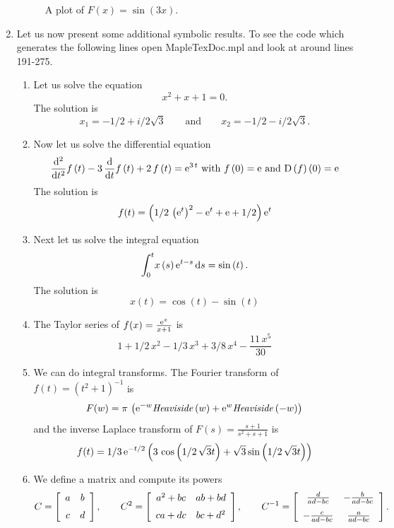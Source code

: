 \documentclass{article}
\begin{document}
\begin{enumerate}
\begin{figure}[H]
 \caption{A plot of \(F(x)=\sin(3x)\).}  \label{FIG001}
 \end{figure}
 \item Let us now present  some additional symbolic results. To see the code which
 generates the following lines open \textsf{MapleTexDoc.mpl} and look at around lines 191-275.
 \begin{enumerate}
 \item Let us solve the equation
 \[
 {x}^{2}+x+1=0. 
 \]
 The solution is
 \[
 x_1=-1/2+i/2\sqrt {3} \qquad \text{and} \qquad x_2=-1/2-i/2\sqrt {3}.  
 \]
 \item Now let us solve the differential equation
 \[
 {\frac {{\rm d}^{2}}{{\rm d}{t}^{2}}}f \left( t \right) -3\,{\frac {\rm d}{{\rm d}t}}f \left( t \right) +2\,f \left( t \right) ={{\rm e}^{3\,t}} \text{ with } f \left( 0 \right) ={\rm e} \text{ and } \mbox {D} \left( f \right)  \left( 0 \right) ={\rm e} 
 \]
 The solution is
 \[
 f(t)= \left( 1/2\, \left( {{\rm e}^{t}} \right) ^{2}-{{\rm e}^{t}}+{\rm e}+1/2 \right) {{\rm e}^{t}} 
 \]
 \item Next let us solve the integral equation
 \[
 \int_{0}^{t}\!x \left( s \right) {{\rm e}^{t-s}}\,{\rm d}s=\sin \left( t \right) . 
 \]
 The solution is
 \[
 x(t)=\cos \left( t \right) -\sin \left( t \right)  
 \]
 \item The Taylor series of \(f(x)={\frac {{{\rm e}^{x}}}{x+1}}\) is
 \[
 1+1/2\,{x}^{2}-1/3\,{x}^{3}+3/8\,{x}^{4}-{\frac {11\,{x}^{5}}{30}}
 \]
 \item We can do integral transforms. The Fourier transform of \(f(t)= \left( {t}^{2}+1 \right) ^{-1}\) is
 \[
 F(w)=\pi\, \left( {{\rm e}^{-w}}{\it Heaviside} \left( w \right) +{{\rm e}^{w}}{\it Heaviside} \left( -w \right)  \right) 
 \]
 and the inverse Laplace transform of \(F(s)={\frac {s+1}{{s}^{2}+s+1}}\) is
 \[
 f(t)=1/3\,{{\rm e}^{-t/2}} \left( 3\,\cos \left( 1/2\,\sqrt {3}t \right) +\sqrt {3}\sin \left( 1/2\,\sqrt {3}t \right)  \right) 
 \]
 \item We define a matrix and compute its powers
 \[
 C= \left[ \begin {array}{cc} a&b\\ \noalign{\medskip}c&d\end {array} \right] , \qquad C^2= \left[ \begin {array}{cc} {a}^{2}+bc&ab+bd\\ \noalign{\medskip}ca+dc&bc+{d}^{2}\end {array} \right] , \qquad C^{-1}= \left[ \begin {array}{cc} {\frac {d}{ad-bc}}&-{\frac {b}{ad-bc}}\\ \noalign{\medskip}-{\frac {c}{ad-bc}}&{\frac {a}{ad-bc}}\end {array} \right] .
\]
\end{enumerate}
\end{enumerate}
\end{document}
